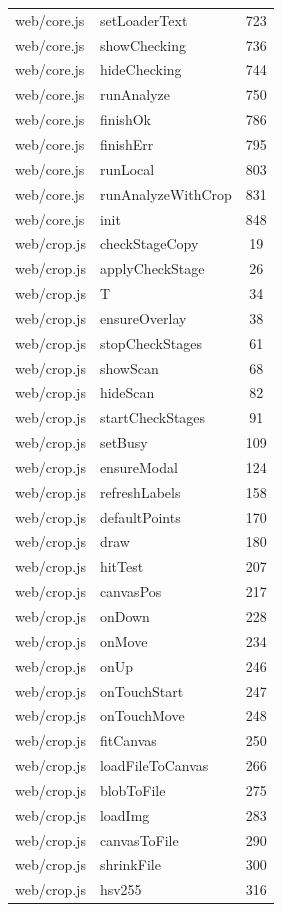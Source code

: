 \begin{center}
\begin{longtable}{@{}p{4.6cm}p{5.2cm}c@{}}
web/core.js & setLoaderText & 723 \\
web/core.js & showChecking & 736 \\
web/core.js & hideChecking & 744 \\
web/core.js & runAnalyze & 750 \\
web/core.js & finishOk & 786 \\
web/core.js & finishErr & 795 \\
web/core.js & runLocal & 803 \\
web/core.js & runAnalyzeWithCrop & 831 \\
web/core.js & init & 848 \\
web/crop.js & checkStageCopy & 19 \\
web/crop.js & applyCheckStage & 26 \\
web/crop.js & T & 34 \\
web/crop.js & ensureOverlay & 38 \\
web/crop.js & stopCheckStages & 61 \\
web/crop.js & showScan & 68 \\
web/crop.js & hideScan & 82 \\
web/crop.js & startCheckStages & 91 \\
web/crop.js & setBusy & 109 \\
web/crop.js & ensureModal & 124 \\
web/crop.js & refreshLabels & 158 \\
web/crop.js & defaultPoints & 170 \\
web/crop.js & draw & 180 \\
web/crop.js & hitTest & 207 \\
web/crop.js & canvasPos & 217 \\
web/crop.js & onDown & 228 \\
web/crop.js & onMove & 234 \\
web/crop.js & onUp & 246 \\
web/crop.js & onTouchStart & 247 \\
web/crop.js & onTouchMove & 248 \\
web/crop.js & fitCanvas & 250 \\
web/crop.js & loadFileToCanvas & 266 \\
web/crop.js & blobToFile & 275 \\
web/crop.js & loadImg & 283 \\
web/crop.js & canvasToFile & 290 \\
web/crop.js & shrinkFile & 300 \\
web/crop.js & hsv255 & 316 \\

\end{longtable}
\end{center}

